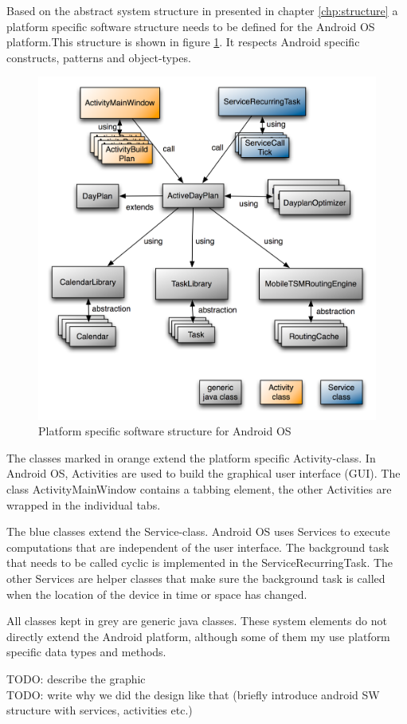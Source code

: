 Based on the abstract system structure in presented in chapter \ref{chp:structure} a platform specific software structure needs to be defined for the Android OS platform.This structure is shown in figure \ref{android_structure}. It respects Android specific constructs, patterns and object-types.
\begin{figure}[h!]
\centering
\includegraphics[width=14cm]{pics/android_structure.png}
\caption{Platform specific software structure for Android OS}
\label{android_structure}
\end{figure}
The classes marked in orange extend the platform specific Activity-class. In Android OS, Activities are used to build the graphical user interface (GUI). The class ActivityMainWindow contains a tabbing element, the other Activities are wrapped in the individual tabs. 

The blue classes extend the Service-class. Android OS uses Services to execute computations that are independent of the user interface. The background task that needs to be called cyclic is implemented in the ServiceRecurringTask. The other Services are helper classes that make sure the background task is called when the location of the device in time or space has changed.

All classes kept in grey are generic java classes. These system elements do not directly extend the Android platform, although some of them my use platform specific data types and methods.
  
TODO: describe the graphic\\
TODO: write why we did the design like that (briefly introduce android SW structure with services, activities etc.)
